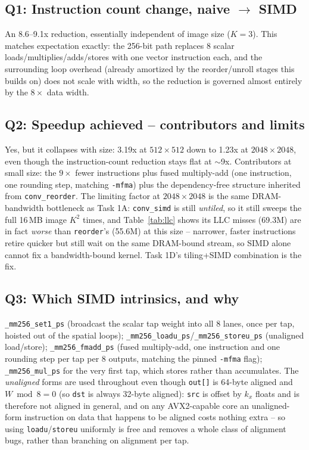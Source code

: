 \documentclass[11pt]{article}
\begin{document}
\subsection*{Q1: Instruction count change, naive $\to$ SIMD}
An 8.6--9.1x reduction, essentially independent of image size ($K{=}3$). This matches
expectation exactly: the 256-bit path replaces 8 scalar loads/multiplies/adds/stores
with one vector instruction each, and the surrounding loop overhead (already amortized
by the reorder/unroll stages this builds on) does not scale with width, so the
reduction is governed almost entirely by the $8\times$ data width.

\subsection*{Q2: Speedup achieved -- contributors and limits}
Yes, but it collapses with size: 3.19x at $512{\times}512$ down to 1.23x at
$2048{\times}2048$, even though the instruction-count reduction stays flat at
$\sim$9x. Contributors at small size: the $9\times$ fewer instructions plus fused
multiply-add (one instruction, one rounding step, matching \texttt{-mfma}) plus the
dependency-free structure inherited from \texttt{conv\_reorder}. The limiting factor at
$2048{\times}2048$ is the same DRAM-bandwidth bottleneck as Task 1A: \texttt{conv\_simd}
is still \emph{untiled}, so it still sweeps the full 16\,MB image $K^2$ times, and
Table~\ref{tab:llc} shows its LLC misses (69.3M) are in fact \emph{worse} than
\texttt{reorder}'s (55.6M) at this size -- narrower, faster instructions retire quicker
but still wait on the same DRAM-bound stream, so SIMD alone cannot fix a bandwidth-bound
kernel. Task 1D's tiling+SIMD combination is the fix.

\subsection*{Q3: Which SIMD intrinsics, and why}
\texttt{\_mm256\_set1\_ps} (broadcast the scalar tap weight into all 8 lanes, once per
tap, hoisted out of the spatial loops); \texttt{\_mm256\_loadu\_ps}/\texttt{\_mm256\_storeu\_ps}
(unaligned load/store); \texttt{\_mm256\_fmadd\_ps} (fused multiply-add, one instruction
and one rounding step per tap per 8 outputs, matching the pinned \texttt{-mfma} flag);
\texttt{\_mm256\_mul\_ps} for the very first tap, which stores rather than accumulates.
The \emph{unaligned} forms are used throughout even though \texttt{out[]} is 64-byte
aligned and $W\bmod 8{=}0$ (so \texttt{dst} is always 32-byte aligned): \texttt{src} is
offset by $k_x$ floats and is therefore not aligned in general, and on any AVX2-capable
core an unaligned-form instruction on data that happens to be aligned costs nothing
extra -- so using \texttt{loadu}/\texttt{storeu} uniformly is free and removes a whole
class of alignment bugs, rather than branching on alignment per tap.
\end{document}
